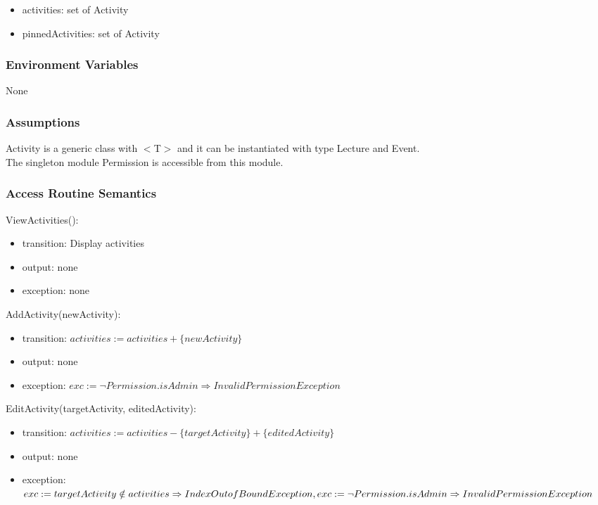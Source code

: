 \documentclass[12pt, titlepage]{article}
\begin{document}
\begin{itemize}
  \item activities: set of Activity
  \item pinnedActivities: set of Activity
\end{itemize}

\subsubsection{Environment Variables}

None

\subsubsection{Assumptions}

Activity is a generic class with $<$T$>$ and it can be instantiated with type Lecture and Event.\\
The singleton module Permission is accessible from this module.

\subsubsection{Access Routine Semantics}

\noindent ViewActivities():
\begin{itemize}
\item transition: Display activities
\item output: none
\item exception: none
\end{itemize}

\noindent AddActivity(newActivity):
\begin{itemize}
\item transition: $activities := activities + \{newActivity\}$
\item output: none
\item exception: $exc := \neg Permission.isAdmin \Rightarrow InvalidPermission Exception$
\end{itemize}

\noindent EditActivity(targetActivity, editedActivity):
\begin{itemize}
\item transition: $activities := activities - \{targetActivity\} + \{editedActivity\}$
\item output: none
\item exception: $exc := targetActivity \notin activities \Rightarrow IndexOutofBound Exception,\\ 
                  exc := \neg Permission.isAdmin \Rightarrow InvalidPermission Exception$
\end{itemize}
\end{document}
